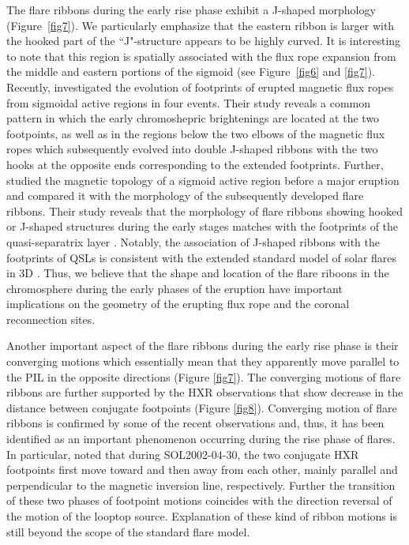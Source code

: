 \documentclass[twocolumn]{aastex6}
\begin{document}
{The flare ribbons during the early rise phase exhibit a J-shaped morphology (Figure~\ref{fig7}). We particularly emphasize that the eastern ribbon is larger with the hooked part of the ``J"-structure appears to be highly curved. 
It is interesting to note that this region is spatially associated with the flux rope expansion from the middle and eastern portions of the sigmoid (see Figure~\ref{fig6} and \ref{fig7}). Recently, \cite{ChengX2016} investigated the evolution of footprints of erupted magnetic flux ropes from sigmoidal active regions in four events. Their study reveals a common pattern in which the early chromoshepric brightenings are located at the two footpoints, as well as in the regions below the two elbows of the magnetic flux ropes which subsequently evolved into double J-shaped ribbons with the two hooks at the opposite ends 
corresponding to the extended footprints. Further, \cite{Zhao2016} studied the magnetic topology of a sigmoid active region before a major eruption and compared it with the morphology of the subsequently developed flare ribbons. Their study reveals that the morphology of flare ribbons showing hooked or J-shaped structures during the early stages matches with the footprints of the quasi-separatrix layer \citep[QSL;][]{Pariat2012,Demoulin1996}. Notably, the association of J-shaped ribbons with the footprints of QSLs is consistent with the extended standard model of solar flares in 3D \citep{Aulanier2012,Janvier2013}. Thus, we believe that the shape and location of the flare riboons in the chromosphere during the early phases of the eruption have important implications on the geometry of the erupting flux rope and the coronal reconnection sites.

Another important aspect of the flare ribbons during the early rise phase is their converging motions which essentially mean that they 
apparently move parallel to the PIL in the opposite directions (Figure \ref{fig7}). The converging motions of flare ribbons are further supported by the HXR observations that show decrease in the distance between conjugate footpoints (Figure \ref{fig8}). Converging motion of flare ribbons is confirmed by some of the recent observations \citep{Ji2006,Ji2007,Liu2008,Joshi2009} and, thus, it has been identified as an important phenomenon occurring during the rise phase of flares. In particular, \cite{Liu2008} noted that during SOL2002-04-30, the two conjugate HXR footpoints first move toward and then away from each other, mainly parallel and perpendicular to the magnetic inversion line, respectively. Further the transition of these two phases of footpoint motions coincides with the direction reversal of the motion of the looptop source. Explanation of these kind of ribbon motions is still beyond the scope of the standard flare model. 

}
\end{document}
